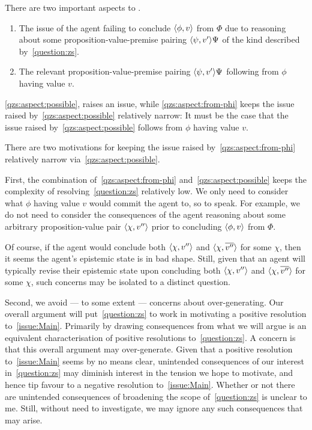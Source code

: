 \begin{note}
  There are two important aspects to \zs{}.
  \begin{enumerate}[label=\alph*., ref=(\alph*)]
  \item
    \label{qzs:aspect:possible}
    The issue of the agent failing to conclude \(\langle \phi, v \rangle\) from \(\Phi\) due to reasoning about some proposition-value-premise pairing \(\langle \psi, v' \rangle{\Psi}\) of the kind described by~\autoref{question:zs}.
  \item
    \label{qzs:aspect:from-phi}
    The relevant proposition-value-premise pairing \(\langle \psi, v' \rangle{\Psi}\) following from \(\phi\) having value \(v\).
  \end{enumerate}

  \ref{qzs:aspect:possible}, raises an issue, while \ref{qzs:aspect:from-phi} keeps the issue raised by~\ref{qzs:aspect:possible} relatively narrow:
  It must be the case that the issue raised by~\ref{qzs:aspect:possible} follows from \(\phi\) having value \(v\).

  There are two motivations for keeping the issue raised by~\ref{qzs:aspect:from-phi} relatively narrow via~\ref{qzs:aspect:possible}.

  First, the combination of~\ref{qzs:aspect:from-phi} and~\ref{qzs:aspect:possible} keeps the complexity of resolving~\autoref{question:zs} relatively low.
  We only need to consider what \(\phi\) having value \(v\) would commit the agent to, so to speak.
  For example, we do not need to consider the consequences of the agent reasoning about some arbitrary proposition-value pair \(\langle \chi, v'' \rangle\) prior to concluding \(\langle \phi, v \rangle\) from \(\Phi\).

  Of course, if the agent would conclude both \(\langle \chi, v'' \rangle\) and \(\langle \chi, \overline{v''} \rangle\) for some \(\chi\), then it seems the agent's epistemic state is in bad shape.
  Still, given that an agent will typically revise their epistemic state upon concluding both \(\langle \chi, v'' \rangle\) and \(\langle \chi, \overline{v''} \rangle\) for some \(\chi\), such concerns may be isolated to a distinct question.

  Second, we avoid --- to some extent --- concerns about over-generating.
  Our overall argument will put~\autoref{question:zs} to work in motivating a positive resolution to~\autoref{issue:Main}.
  Primarily by drawing consequences from what we will argue is an equivalent characterisation of positive resolutions to~\autoref{question:zs}.
  A concern is that this overall argument may over-generate.
  Given that a positive resolution to~\autoref{issue:Main} seems by no means clear, unintended consequences of our interest in~\autoref{question:zs} may diminish interest in the tension we hope to motivate, and hence tip favour to a negative resolution to~\autoref{issue:Main}.
  Whether or not there are unintended consequences of broadening the scope of~\autoref{question:zs} is unclear to me.
  Still, without need to investigate, we may ignore any such consequences that may arise.
\end{note}

